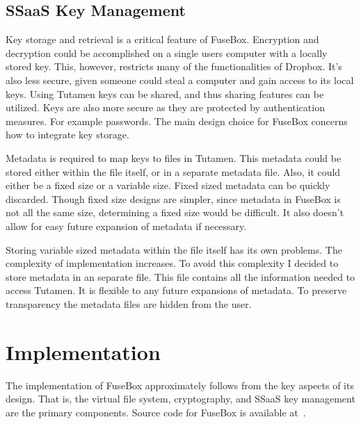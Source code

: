\documentclass[11pt,twocolumn,letterpaper]{article}
\newcommand{\appname}{FuseBox }
\newcommand{\appnameWOspace}{FuseBox}
\newcommand{\custos}{Tutamen }
\newcommand{\custosWOspace}{Tutamen}
\begin{document}
\subsection{SSaaS Key Management}
\label{sec:keystorage}
Key storage and retrieval is a critical feature of \appnameWOspace. 
Encryption and decryption could be accomplished on a single users
computer with a locally stored key. This, however, restricts many of the
functionalities of Dropbox. It's also less secure, given someone could
steal a computer and gain access to its local keys.
Using \custos keys can be shared, and thus 
sharing features can be utilized. Keys are also more secure as they
are protected by authentication measures. For example passwords.  
The main design choice for \appname
concerns how to integrate key storage.  
\par Metadata is required to map keys to files in \custosWOspace. This
metadata could be stored either within the file itself, or in a
separate metadata file. Also, it could either be a fixed size or a
variable size. Fixed sized metadata can be quickly discarded. Though
fixed size designs are simpler, since metadata in \appname is not all the same size,
determining a fixed size would be difficult. It also doesn't allow for
easy future expansion of metadata if necessary. 
\par Storing variable sized metadata within the file itself has its
own problems. The complexity of implementation increases. To avoid
this complexity I decided to store metadata in an separate file. This
file contains all the information needed to access \custosWOspace. It
is flexible to any future expansions of metadata. 
To preserve transparency the metadata files are hidden from the user. 

\section{Implementation}
\label{sec:implementation}
The implementation of \appname approximately follows from the key aspects
of its design. That is, the virtual file system, cryptography, and
SSaaS key management
are the primary components. Source code for \appname is available at~\cite{FuseBox}.
\end{document}
